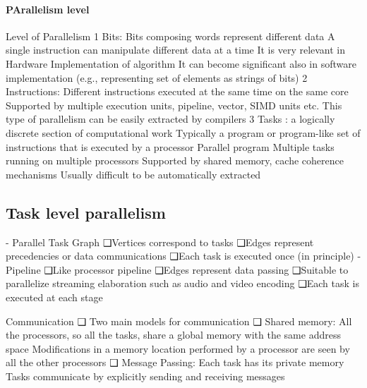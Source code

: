 \paragraph*{PArallelism level}
Level of Parallelism
1 Bits: Bits composing words represent different data
A single instruction can manipulate different data
at a time
It is very relevant in Hardware Implementation of
algorithm
It can become significant also in software
implementation (e.g., representing set of elements
as strings of bits)
2 Instructions: Different instructions executed at the same time
on the same core
Supported by multiple execution units, pipeline,
vector, SIMD units etc.
This type of parallelism can be easily extracted by
compilers
3 Tasks :  a logically discrete section of computational
work
Typically a program or program-like set of
instructions that is executed by a processor
Parallel program
Multiple tasks running on multiple processors
Supported by shared memory, cache coherence
mechanisms
 Usually difficult to be automatically extracted

\subsection{Task level parallelism}
- Parallel Task Graph
❑Vertices correspond
to tasks
❑Edges represent
precedencies or
data
communications
❑Each task is
executed once (in
principle)
 - Pipeline
 ❑Like processor pipeline
 ❑Edges represent data
 passing
 ❑Suitable to parallelize
 streaming elaboration such
 as audio and video
 encoding
 ❑Each task is executed at
 each stage

 Communication
❑ Two main models for communication
❑ Shared memory:
All the processors, so all the tasks, share a
global memory with the same address space
Modifications in a memory location performed
by a processor are seen by all the other
processors
❑ Message Passing:
Each task has its private memory
Tasks communicate by explicitly sending and
receiving messages